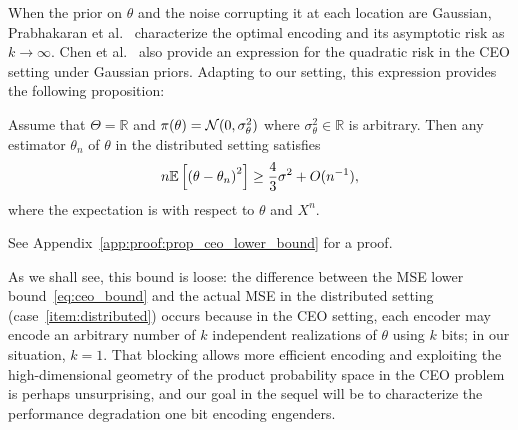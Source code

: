 When the prior on $\theta$ and the noise corrupting it at each location are
Gaussian, Prabhakaran et al.~\cite{prabhakaran2004rate} characterize the
optimal encoding and its asymptotic risk as $k \to \infty$.  Chen et
al.~\cite{chen2004upper} also provide an expression for the quadratic risk
in the CEO setting under Gaussian priors. Adapting to our setting, this
expression provides the following proposition:
\begin{prop} \label{prop:ceo_lower_bound}
  Assume that $\Theta = \mathbb R$ and $\pi(\theta) =
  \mathcal{N}(0,\sigma_\theta^2)$ where $\sigma_\theta^2 \in \mathbb R$ is
  arbitrary. Then any estimator ${\theta}_n$ of $\theta$ in the distributed
  setting satisfies
  \begin{equation} \label{eq:ceo_bound}
    n \mathbb{E}\left[ \left( \theta - \theta_n \right)^2\right] \geq \frac{4}{3} \sigma^2 + O(n^{-1}),
  \end{equation}
  where the expectation is with respect to $\theta$ and $X^n$.
\end{prop}
\noindent
See Appendix~\ref{app:proof:prop_ceo_lower_bound} for a proof.

As we shall see, this bound is loose: the difference between the MSE lower
bound~\eqref{eq:ceo_bound} and the actual MSE in the distributed setting
(case~\eqref{item:distributed}) occurs because in the CEO setting, each
encoder may encode an arbitrary number of $k$ independent realizations of
$\theta$ using $k$ bits; in our situation, $k = 1$. That blocking allows
more efficient encoding and exploiting the high-dimensional geometry of the
product probability space in the CEO problem is perhaps unsurprising, and
our goal in the sequel will be to characterize the performance degradation
one bit encoding engenders.
